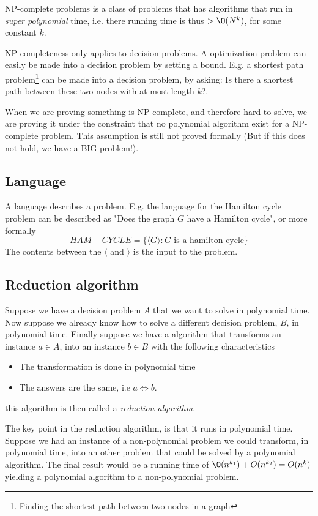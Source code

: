 \documentclass[10pt]{article}
\begin{document}
NP-complete problems is a class of problems that has algorithms that run in \emph{super polynomial} time, i.e. there running time is thus $>\O(N^k)$, for some constant $k$.

NP-completeness only applies to decision problems. A optimization problem can easily be made into a decision problem by setting a bound. E.g. a shortest path problem\footnote{Finding the shortest path between two nodes in a graph} can be made into a decision problem, by asking: Is there a shortest path between these two nodes with at most length $k$?.  

When we are proving something is NP-complete, and therefore hard to solve, we are proving it under the constraint that no polynomial algorithm exist for a NP-complete problem. This assumption is still not proved formally (But if this does not hold, we have a BIG problem!).


\subsection{Language} %
\label{sub:language}
A language describes a problem. E.g. the language for the Hamilton cycle problem can be described as "Does the graph $G$ have a Hamilton cycle", or more formally
\begin{equation}
HAM-CYCLE = \{\langle G \rangle: G \text{ is a hamilton cycle}\}   
\end{equation}
The contents between the $\langle$ and $\rangle$ is the input to the problem.

\subsection{Reduction algorithm} %
\label{sub:reduction_algorithm}
Suppose we have a decision problem $A$ that we want to solve in polynomial time. Now suppose we already know how to solve a different decision problem, $B$, in polynomial time. Finally suppose we have a algorithm that transforms an instance $a \in A$, into an instance $b \in B$ with the following characteristics
\begin{itemize}
  \item The transformation is done in polynomial time
  \item The answers are the same, i.e $a \Leftrightarrow b$.
\end{itemize}
this algorithm is then called a \emph{reduction algorithm}. 

The key point in the reduction algorithm, is that it runs in polynomial time. Suppose we had an instance of a non-polynomial problem we could transform, in polynomial time, into an other problem that could be solved by a polynomial algorithm. The final result would be a running time of $\O(n^{k_1})+O(n^{k_2}) = O(n^k)$ yielding a polynomial algorithm to a non-polynomial problem.
\end{document}
